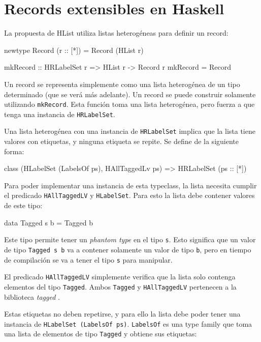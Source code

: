 \section{Records extensibles en Haskell}

La propuesta de HList \cite{Kiselyov:2004:STH:1017472.1017488} utiliza listas heterogéneas para definir un record:

\begin{code}
newtype Record (r :: [*]) = Record (HList r)

mkRecord :: HRLabelSet r => HList r -> Record r
mkRecord = Record
\end{code}

Un record se representa simplemente como una lista heterogénea de un tipo determinado (que se verá más adelante). Un record se puede construir solamente utilizando \texttt{mkRecord}. Esta función toma una lista heterogénea, pero fuerza a que tenga una instancia de \texttt{HRLabelSet}.

Una lista heterogénea con una instancia de \texttt{HRLabelSet} implica que la lista tiene valores con etiquetas, y ninguna etiqueta se repite. Se define de la siguiente forma:

\begin{code}
class (HLabelSet (LabelsOf ps), HAllTaggedLv ps) =>
  HRLabelSet (ps :: [*])
\end{code}

Para poder implementar una instancia de esta typeclass, la lista necesita cumplir el predicado \texttt{HAllTaggedLV} y \texttt{HLabelSet}. Para esto la lista debe contener valores de este tipo:

\begin{code}
data Tagged s b = Tagged b
\end{code}

Este tipo permite tener un \textit{phantom type} en el tipo \texttt{s}. Esto significa que un valor de tipo \texttt{Tagged s b} va a contener solamente un valor de tipo \texttt{b}, pero en tiempo de compilación se va a tener el tipo \texttt{s} para manipular.

El predicado \texttt{HAllTaggedLV} simplemente verifica que la lista solo contenga elementos del tipo \texttt{Tagged}. Ambos \texttt{Tagged} y \texttt{HAllTaggedLV} pertenecen a la biblioteca \textit{tagged} \cite{HaskellTagged}.
 
Estas etiquetas no deben repetirse, y para ello la lista debe poder tener una instancia de \texttt{HLabelSet (LabelsOf ps)}. \texttt{LabelsOf} es una type family que toma una lista de elementos de tipo \texttt{Tagged} y obtiene sus etiquetas:

